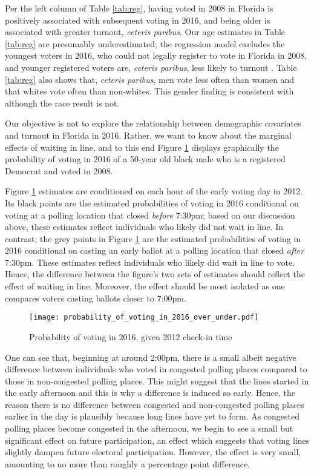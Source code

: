 \documentclass[12pt,titlepage]{article}
\begin{document}
Per the left column of Table \ref{tab:reg}, having voted in 2008 in
Florida is positively associated with subsequent voting in 2016, and
being older is associated with greater turnout, \emph{ceteris
  paribus}.  Our age estimates in Table \ref{tab:reg} are presumably
underestimated; the regression model excludes the youngest voters in
2016, who could not legally register to vote in Florida in 2008, and
younger registered voters are, \emph{ceteris paribus}, less likely to
turnout \citep{shinosmith:registrationtiming}.  Table \ref{tab:reg}
also shows that, \emph{ceteris paribus}, men vote less often than
women and that whites vote often than non-whites.  This gender finding
is consistent with \citet{leighleynagler:whovotesnow} although the
race result is not.

Our objective is not to explore the relationship between demographic
covariates and turnout in Florida in 2016.  Rather, we want to know
about the marginal effects of waiting in line, and to this end Figure
\ref{fig:prvoting2016} displays graphically the probability of voting
in 2016 of a 50-year old black male who is a registered Democrat and
voted in 2008.

Figure \ref{fig:prvoting2016} estimates are conditioned on each hour
of the early voting day in 2012. Its black points are the estimated
probabilities of voting in 2016 conditional on voting at a polling
location that closed \emph{before} 7:30pm; based on our discussion
above, these estimates reflect individuals who likely did not wait in
line.  In contrast, the grey points in Figure \ref{fig:prvoting2016}
are the estimated probabilities of voting in 2016 conditional on
casting an early ballot at a polling location that closed \emph{after}
7:30pm.  These estimates reflect individuals who likely did wait in
line to vote.  Hence, the difference between the figure's two sets of
estimates should reflect the effect of waiting in line.  Moreover, the
effect should be most isolated as one compares voters casting ballots
closer to 7:00pm.

\begin{figure}[!ht]
\caption{Probability of voting in 2016, given 2012 check-in time}
  \label{fig:prvoting2016}
  \centering
    \centering\texttt{[image: probability\_of\_voting\_in\_2016\_over\_under.pdf]}
\end{figure}

One can see that, beginning at around 2:00pm, there is a small albeit
negative difference between individuals who voted in congested polling
places compared to those in non-congested polling places.  This might
suggest that the lines started in the early afternoon and this is why
a difference is induced so early.  Hence, the reason there is no
difference between congested and non-congested polling places earlier
in the day is plausibly because long lines have yet to form. As
congested polling places become congested in the afternoon, we begin
to see a small but significant effect on future participation, an
effect which suggests that voting lines slightly dampen future
electoral participation.  However, the effect is very small, amounting
to no more than roughly a percentage point difference.
\end{document}
